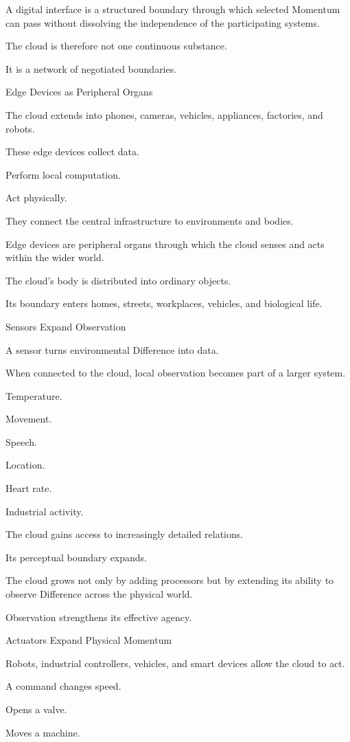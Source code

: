 A digital interface is a structured boundary through which selected Momentum can pass without dissolving the independence of the participating systems.

The cloud is therefore not one continuous substance.

It is a network of negotiated boundaries.

Edge Devices as Peripheral Organs

The cloud extends into phones, cameras, vehicles, appliances, factories, and robots.

These edge devices collect data.

Perform local computation.

Act physically.

They connect the central infrastructure to environments and bodies.

Edge devices are peripheral organs through which the cloud senses and acts within the wider world.

The cloud’s body is distributed into ordinary objects.

Its boundary enters homes, streets, workplaces, vehicles, and biological life.

Sensors Expand Observation

A sensor turns environmental Difference into data.

When connected to the cloud, local observation becomes part of a larger system.

Temperature.

Movement.

Speech.

Location.

Heart rate.

Industrial activity.

The cloud gains access to increasingly detailed relations.

Its perceptual boundary expands.

The cloud grows not only by adding processors but by extending its ability to observe Difference across the physical world.

Observation strengthens its effective agency.

Actuators Expand Physical Momentum

Robots, industrial controllers, vehicles, and smart devices allow the cloud to act.

A command changes speed.

Opens a valve.

Moves a machine.


